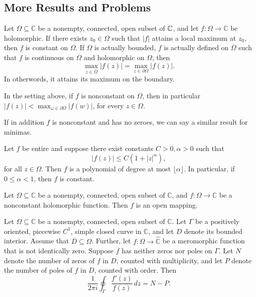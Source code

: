 \subsection{More Results and Problems}

\begin{theorem}
Let $\Omega\subseteq\mathbb{C}$ be a nonempty, connected, open subset of $\mathbb{C}$, and let
$f \colon \Omega\to\mathbb{C}$ be holomorphic. If there exists $z_0\in\Omega$ such that
$|f|$ attains a local maximum at $z_0$, then $f$ is constant on $\Omega$. 
If $\Omega$ is actually bounded, $f$ is actually defined on $\overline{\Omega}$ such that 
$f$ is continuous on $\overline{\Omega}$ and holomorphic on $\Omega$, then 
\[
\max_{z\in\overline{\Omega}}|f(z)| =
\max_{z\in\partial\Omega}|f(z)|.
\]
In otherwords, it attains its maximum on the boundary. 
\end{theorem}

\begin{remark}
In the setting above, if $f$ is nonconstant on $\Omega$, then in particular 
$|f(z)| < \max_{\omega \in \partial \Omega} |f(w)|$, for every $z \in \Omega$.
\end{remark}

\begin{remark}
If in addition $f$ is nonconstant and has no zeroes, we can say a similar
result for minimas.
\end{remark}

\begin{theorem}
Let $f$ be entire and suppose there exist constants $C>0, \alpha > 0$ such that
\[
|f(z)|\leq C(1+|z|^\alpha),
\]
for all $z\in\Omega$. Then $f$ is a polynomial of degree at most
$\lfloor\alpha\rfloor$. In particular, if $0\leq\alpha<1$, then $f$ is constant.
\end{theorem}

\begin{theorem}
Let $\Omega\subseteq\mathbb{C}$ be a nonempty, connected, open subset of $\mathbb{C}$,
and $f:\Omega\to\mathbb{C}$ be a nonconstant holomorphic function.
Then $f$ is an open mapping.
\end{theorem}

\begin{theorem}
Let $\Omega\subseteq\mathbb{C}$ be a nonempty, connected, open subset of $\mathbb{C}$.
Let $\Gamma$ be a positively oriented, piecewise $C^1$, simple closed curve in
$\mathbb{C}$, and let $D$ denote its bounded interior.
Assume that $\overline{D}\subseteq\Omega$. Further, let $f \colon \Omega\to\widehat{\mathbb{C}}$ 
be a meromorphic function that is not identically zero.
Suppose $f$ has neither zeros nor poles on $\Gamma$.
Let $N$ denote the number of zeros of $f$ in $D$, counted with multiplicity,
and let $P$ denote the number of poles of $f$ in $D$, counted with order.
Then
\[
\frac{1}{2\pi i}
\oint_{\Gamma}
\frac{f'(z)}{f(z)}\,dz
=
N-P.
\]
\end{theorem}

